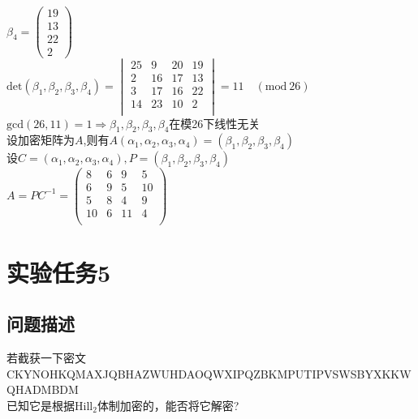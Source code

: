 \documentclass[12pt]{article}
\begin{document}
\begin{enumerate}
$\beta_4=\begin{pmatrix}19\\13\\22\\2\end{pmatrix}$\\
$\mathrm{det}(\beta_1,\beta_2,\beta_3,\beta_4)=
\begin{vmatrix}
   25 &   9   &20&   19\\
    2  & 16  & 17 &  13\\
    3   &17 &  16  & 22\\
   14   &23&   10   & 2\\
\end{vmatrix}
=11\quad(\mathrm{mod}~26)
$\\
$\mathrm{gcd}(26,11)=1\Rightarrow\beta_1,\beta_2,\beta_3,\beta_4$在模26下线性无关\\
设加密矩阵为$A$,则有$A(\alpha_1,\alpha_2,\alpha_3,\alpha_4)=(\beta_1,\beta_2,\beta_3,\beta_4)$\\
设$C=(\alpha_1,\alpha_2,\alpha_3,\alpha_4), P=(\beta_1,\beta_2,\beta_3,\beta_4)$\\
$A=PC^{-1}=
\begin{pmatrix}
    8&    6   & 9&    5\\
    6 &   9  &  5 &  10\\
    5  &  8 &   4  &  9\\
   10   & 6&   11   & 4\\

\end{pmatrix}
$

\end{enumerate}
\section*{实验任务5}
\subsection*{问题描述}
若截获一下密文\\
CKYNOHKQMAXJQBHAZWUHDAOQWXIPQZBKMPUTIPVSWSBYXKKWQHADMBDM\\
已知它是根据Hill$_2$体制加密的，能否将它解密?
\end{document}
